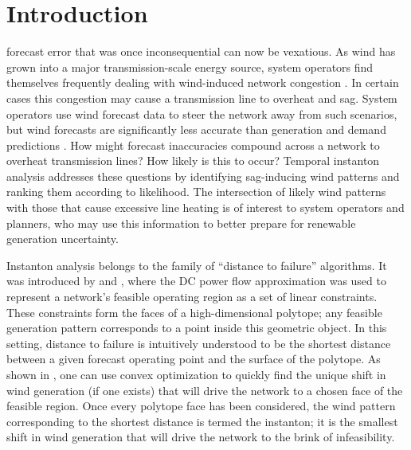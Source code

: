 \documentclass[journal,twoside]{IEEEtran}
\begin{document}
\section{Introduction}\label{sec:intro}
 forecast error that was once inconsequential can now be vexatious. As wind has grown into a major transmission-scale energy source, system operators find themselves frequently dealing with wind-induced network congestion \cite{rogers2010}. In certain cases this congestion may cause a transmission line to overheat and sag. System operators use wind forecast data to steer the network away from such scenarios, but wind forecasts are significantly less accurate than generation and demand predictions \cite{parsons2004}. How might forecast inaccuracies compound across a network to overheat transmission lines? How likely is this to occur? Temporal instanton analysis addresses these questions by identifying sag-inducing wind patterns and ranking them according to likelihood. The intersection of likely wind patterns with those that cause excessive line heating is of interest to system operators and planners, who may use this information to better prepare for renewable generation uncertainty.

Instanton analysis belongs to the family of ``distance to failure'' algorithms. It was introduced by \cite{chertkov2011} and \cite{chertkov2011a}, where the DC power flow approximation was used to represent a network's feasible operating region as a set of linear constraints. These constraints form the faces of a high-dimensional polytope; any feasible generation pattern corresponds to a point inside this geometric object. In this setting, distance to failure is intuitively understood to be the shortest distance between a given forecast operating point and the surface of the polytope. As shown in \cite{chertkov2011a}, one can use convex optimization to quickly find the unique shift in wind generation (if one exists) that will drive the network to a chosen face of the feasible region. Once every polytope face has been considered, the wind pattern corresponding to the shortest distance is termed the instanton; it is the smallest shift in wind generation that will drive the network to the brink of infeasibility.
\end{document}
